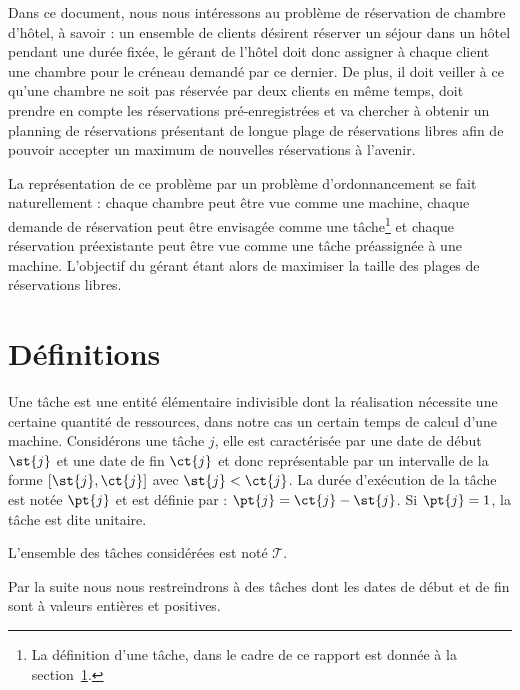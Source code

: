 \documentclass[a4paper,9pt]{report}
\begin{document}
Dans ce document, nous nous intéressons au problème de réservation de chambre d'hôtel, à savoir : un
ensemble de clients désirent réserver un séjour dans un hôtel pendant une durée fixée, le gérant de
l'hôtel doit donc assigner à chaque client une chambre pour le créneau demandé par ce dernier. De
plus, il doit veiller à ce qu'une chambre ne soit pas réservée par deux clients en même temps, doit
prendre en compte les réservations pré-enregistrées et va chercher à obtenir un planning de
réservations présentant de longue plage de réservations libres afin de pouvoir accepter un maximum
de nouvelles réservations à l'avenir.

La représentation de ce problème par un problème d'ordonnancement se fait naturellement : chaque
chambre peut être vue comme une machine, chaque demande de réservation peut être envisagée comme une
tâche\footnote{La définition d'une tâche, dans le cadre de ce rapport est donnée à la
section~\ref{intro_def}.} et chaque réservation préexistante peut être vue comme une tâche
préassignée à une machine. L'objectif du gérant étant alors de maximiser la taille des plages de
réservations libres.


\section{Définitions}
\label{intro_def}

\begin{ndf}[Tâche]
    Une tâche est une entité élémentaire indivisible dont la réalisation nécessite une certaine
    quantité de ressources, dans notre cas un certain temps de calcul d'une machine. Considérons une
    tâche $j$, elle est caractérisée par une date de début $\st{j}$ et une date de fin $\ct{j}$ et donc
    représentable par un intervalle de la forme $[\st{j}, \ct{j}]$ avec $\st{j} < \ct{j}$. La durée d'exécution
    de la tâche est notée $\pt{j}$ et est définie par : $\pt{j} = \ct{j} - \st{j}$. Si $\pt{j} = 1$,
    la tâche est dite unitaire.

    L'ensemble des tâches considérées est noté $\mathcal{T}$.
\end{ndf}

\begin{nrmq}
    Par la suite nous nous restreindrons à des tâches dont les dates de début et de fin sont à
    valeurs entières et positives.
\end{nrmq}
\end{document}
